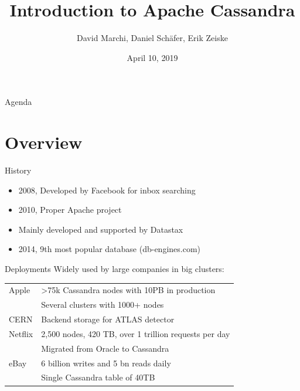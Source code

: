 \documentclass[
  10pt
]{beamer}
\title{Introduction to Apache Cassandra}
\subtitle{}
\date{April 10, 2019}
\author{David Marchi, Daniel Schäfer, Erik Zeiske}
\begin{document}
\maketitle

\begin{frame}{Agenda}
  \tableofcontents[pausesections]
\end{frame}

\section{Overview}  %

\begin{frame}{History}
  \begin{itemize}
    \item 2008, Developed by Facebook for inbox searching
    \item 2010, Proper Apache project
    \item Mainly developed and supported by Datastax
    \item 2014, 9th most popular database (db-engines.com)
  \end{itemize}
\end{frame}

\begin{frame}{Deployments}
  Widely used by large companies in big clusters:

  \begin{tabular}{@{}ll}
    \hline
    Apple   & >75k Cassandra nodes with 10PB in production \\
            & Several clusters with 1000+ nodes \\
    \hline
    CERN    & Backend storage for ATLAS detector \\
    \hline
    Netflix & 2,500 nodes, 420 TB, over 1 trillion requests per day \\
            & Migrated from Oracle to Cassandra \\
    \hline
    eBay    & 6 billion writes and 5 bn reads daily \\
            & Single Cassandra table of 40TB \\
    \hline
  \end{tabular}

\end{frame}
\end{document}
